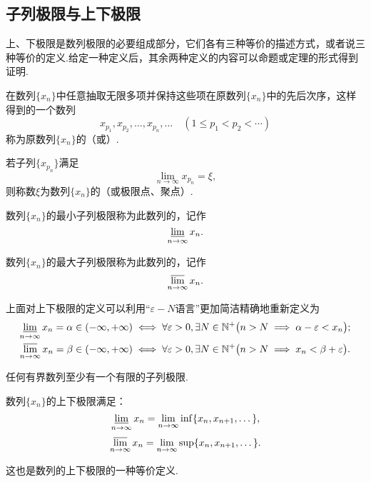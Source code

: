 \subsection{子列极限与上下极限}
上、下极限是数列极限的必要组成部分，它们各有三种等价的描述方式，或者说三种等价的定义.给定一种定义后，其余两种定义的内容可以命题或定理的形式得到证明.
\begin{definition}
在数列\(\{x_n\}\)中任意抽取无限多项并保持这些项在原数列\(\{x_n\}\)中的先后次序，这样得到的一个数列\[
x_{p_1},x_{p_2},\dotsc,x_{p_n},\dotsc
\quad(1 \leqslant p_1 < p_2 < \dotsb)
\]称为原数列\(\{x_n\}\)的（或）.

若子列\(\{x_{p_n}\}\)满足\[
\lim\limits_{n\to\infty} x_{p_n} = \xi,
\]则称数\(\xi\)为数列\(\{x_n\}\)的（或极限点、聚点）.

数列\(\{x_n\}\)的最小子列极限称为此数列的，记作\[
\varliminf\limits_{n\to\infty} x_n.
\]

数列\(\{x_n\}\)的最大子列极限称为此数列的，记作\[
\varlimsup\limits_{n\to\infty} x_n.
\]
\end{definition}
上面对上下极限的定义可以利用“\(\varepsilon-N\)语言”更加简洁精确地重新定义为\begin{align*}
\varliminf\limits_{n\to\infty} x_n = \alpha \in (-\infty,+\infty)
&\iff \forall\varepsilon>0, \exists N\in\mathbb{N}^+ \bigl( n>N \implies \alpha-\varepsilon < x_n \bigr); \\
\varlimsup\limits_{n\to\infty} x_n = \beta \in (-\infty,+\infty)
&\iff \forall\varepsilon>0, \exists N\in\mathbb{N}^+ \bigl( n>N \implies x_n < \beta+\varepsilon \bigr).
\end{align*}

\begin{theorem}\label{theorem:极限.波尔查诺-魏尔斯特拉斯原理}
任何有界数列至少有一个有限的子列极限.
\end{theorem}

\begin{theorem}\label{theorem:极限.上下极限的等价定义1}
数列\(\{x_n\}\)的上下极限满足：\[
\varliminf\limits_{n\to\infty} x_n = \lim\limits_{n\to\infty} \inf\{x_n,x_{n+1},\dotsc\},
\]\[
\varlimsup\limits_{n\to\infty} x_n = \lim\limits_{n\to\infty} \sup\{x_n,x_{n+1},\dotsc\}.
\]
\end{theorem}
这也是数列的上下极限的一种等价定义.


